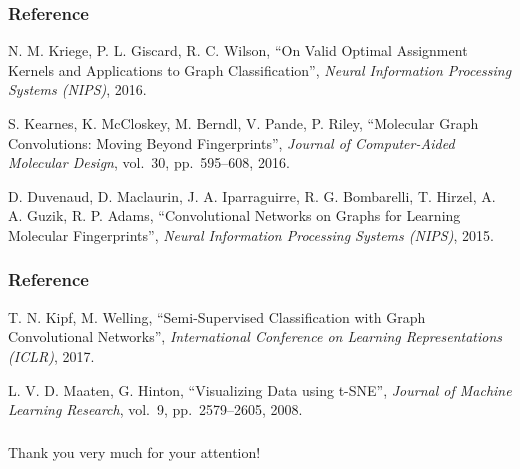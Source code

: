 \documentclass{beamer}
\begin{document}
\begin{frame}
\frametitle{Reference}
\begin{justify}
\begin{thebibliography}{9}

   N. M. Kriege, P. L. Giscard, R. C. Wilson,
   ``On Valid Optimal Assignment Kernels and Applications to Graph Classification'',
   \textit{Neural Information Processing Systems (NIPS)}, 2016.

   S. Kearnes, K. McCloskey, M. Berndl, V. Pande, P. Riley,
   ``Molecular Graph Convolutions: Moving Beyond Fingerprints'',
   \textit{Journal of Computer-Aided Molecular Design}, vol.~30, pp.~595--608, 2016.

   D. Duvenaud, D. Maclaurin, J. A. Iparraguirre, R. G. Bombarelli, T. Hirzel, A. A. Guzik, R. P. Adams,
   ``Convolutional Networks on Graphs for Learning Molecular Fingerprints'',
   \textit{Neural Information Processing Systems (NIPS)}, 2015.
  
\end{thebibliography}
\end{justify}
\end{frame}

\begin{frame}
\frametitle{Reference}
\begin{justify}
\begin{thebibliography}{9}
   
   T. N. Kipf, M. Welling,
   ``Semi-Supervised Classification with Graph Convolutional Networks'',
   \textit{International Conference on Learning Representations (ICLR)}, 2017.

   L. V. D. Maaten, G. Hinton,
   ``Visualizing Data using t-SNE'',
   \textit{Journal of Machine Learning Research}, vol.~9, pp.~2579--2605, 2008.

\end{thebibliography}
\end{justify}
\end{frame}

\begin{frame}
\frametitle{}
\begin{center}
Thank you very much for your attention!
\end{center}
\end{frame}
\end{document}
